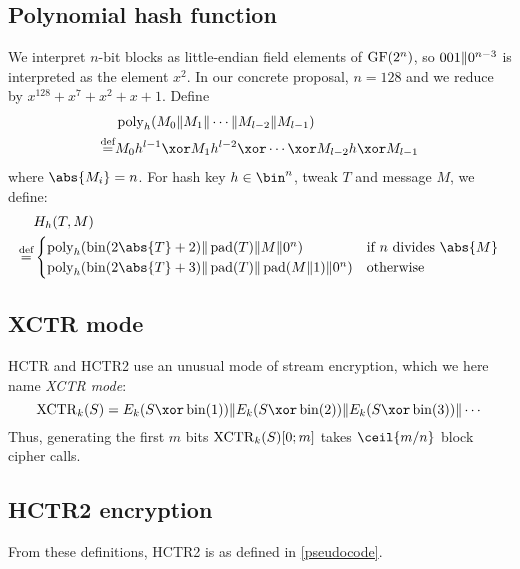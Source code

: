 \documentclass[hctr.tex]{subfiles}
\begin{document}
\subsection{Polynomial hash function}\label{hashspec}
We interpret \(n\)-bit blocks as little-endian field elements of \(\operatorname{GF}(2^n)\),
so \(001 \Vert 0^{n-3}\) is interpreted as the element \(x^2\).
In our concrete proposal, \(n=128\) and we reduce by
\(x^{128} + x^7 + x^2 + x + 1\).
Define
\begin{align*}
    & \poly_h(M_0 \Concat M_1 \Concat \cdots \Concat M_{l-2} \Concat M_{l-1}) \\
    \defeq & M_0h^{l-1} \xor M_1h^{l-2} \xor \cdots \xor M_{l-2}h \xor M_{l-1}
\end{align*}
where \(\abs{M_i} = n\).
For hash key \(h \in \bin^n\), tweak \(T\) and message \(M\), we define:
\begin{align*}
    & H_h(T, M) \\
    \defeq & 
    \begin{cases}
        \poly_h(\fromint(2\abs{T} + 2) \Concat \pad(T) \Concat M \Concat 0^n) &
        \text{if } n \text{ divides } \abs{M} \\
        \poly_h(\fromint(2\abs{T} + 3) \Concat \pad(T) \Concat \pad(M \Concat 1) \Concat 0^n) &
        \text{otherwise}
    \end{cases}
\end{align*}

\subsection{XCTR mode}
HCTR and HCTR2 use an unusual mode of stream encryption,
which we here name \emph{XCTR mode}:
\begin{displaymath}
    \XCTR_k(S) = E_k(S \xor \fromint(1)) \Concat E_k(S \xor \fromint(2)) \Concat E_k(S \xor \fromint(3)) \Concat \cdots
\end{displaymath}
Thus, generating the first \(m\) bits \(\operatorname{XCTR}_k(S)[0; m]\) takes \(\ceil{m/n}\) block cipher calls. 

\subsection{HCTR2 encryption}
From these definitions, HCTR2 is as defined in \autoref{pseudocode}.

\end{document}
